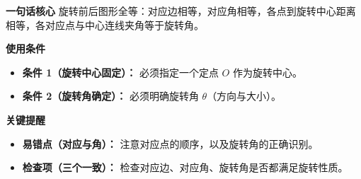 \begin{summarybox}
	\textbf{\textcolor{CSummary}{一句话核心}}
	旋转前后图形全等：对应边相等，对应角相等，各点到旋转中心距离相等，各对应点与中心连线夹角等于旋转角。

	\medskip
	\textbf{\textcolor{CSummary}{使用条件}}
	\begin{itemize}[leftmargin=*, itemsep=0.5em, topsep=0.4em]
		\item \textbf{条件 1（旋转中心固定）：} 必须指定一个定点 $O$ 作为旋转中心。
		\item \textbf{条件 2（旋转角确定）：} 必须明确旋转角 $\theta$（方向与大小）。
	\end{itemize}

	\medskip
	\textbf{\textcolor{CSummary}{关键提醒}}
	\begin{itemize}[leftmargin=*, itemsep=0.5em, topsep=0.4em]
		\item \textbf{易错点（对应与角）：} 注意对应点的顺序，以及旋转角的正确识别。
		\item \textbf{检查项（三个一致）：} 检查对应边、对应角、旋转角是否都满足旋转性质。
	\end{itemize}

\end{summarybox}

